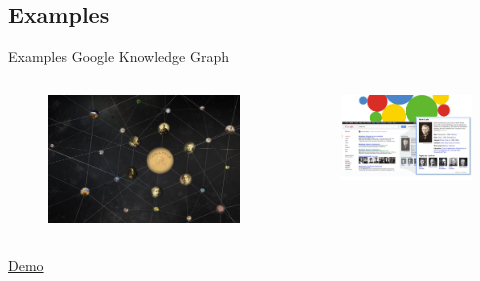 \documentclass[onlymath,xcolor=pdftex,dvipsnames,table]{beamer}
\newcommand{\head}[1]{{\large\color{OliveGreen}#1\\[2pt]}}
\begin{document}
\subsection{Examples}
\begin{frame}{Examples}
\head{Google Knowledge Graph~\cite{googleknowledgegraph}}
\begin{columns}[c]
  \begin{figure}
    \centering
    \includegraphics[width=\linewidth]{120701_google_knowledge_graph.jpg}
  \end{figure}
  \begin{figure}
    \centering
    \includegraphics[width=\linewidth]{Google-Knowledge-Graph.jpg}
  \end{figure}
\end{columns}
\begin{center}
  \href{http://www.google.com/insidesearch/features/search/knowledge.html}{\large Demo}
\end{center}
\end{frame}
\end{document}
